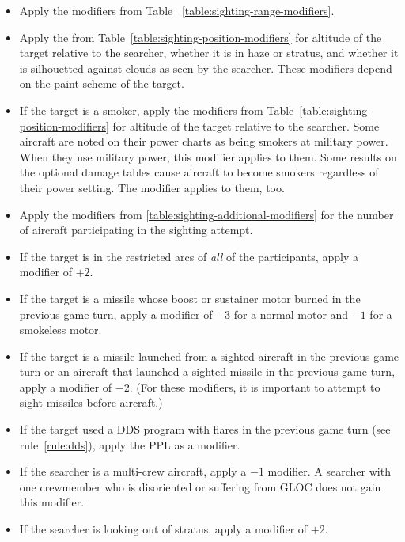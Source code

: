 {\begin{itemize}
    \item {} Apply the modifiers from Table ~\ref{table:sighting-range-modifiers}.
    \item {} Apply the from Table~\ref{table:sighting-position-modifiers} for altitude of the target relative to the searcher, whether it is in haze or stratus, and whether it is silhouetted against clouds as seen by the searcher. These modifiers depend on the paint scheme of the target.
    \item {} If the target is a smoker, apply the modifiers from Table~\ref{table:sighting-position-modifiers} for altitude of the target relative to the searcher. Some aircraft are noted on their power charts as being smokers at military power. When they use military power, this modifier applies to them. Some results on the optional damage tables cause aircraft to become smokers regardless of their power setting. The modifier applies to them, too.
    \item {} Apply the modifiers from \ref{table:sighting-additional-modifiers} for the number of aircraft participating in the sighting attempt. 
    \item {} If the target is in the restricted arcs of \emph{all} of the participants, apply a modifier of $+2$.
    \item {} If the target is a missile whose boost or sustainer motor burned in the previous game turn, apply a modifier of $-3$ for a normal motor and $-1$ for a smokeless motor.
    \item {} If the target is a missile launched from a sighted aircraft in the previous game turn or an aircraft that launched a sighted missile in the previous game turn, apply a modifier of $-2$. (For these modifiers, it is important to attempt to sight missiles before aircraft.)
    \item {} If the target used a DDS program with flares in the previous game turn (see rule~\ref{rule:dds}), apply the PPL as a modifier.
    \item {} If the searcher is a multi-crew aircraft,    
    apply a $-1$ modifier. A searcher with one crewmember who is disoriented or suffering from GLOC does not gain this modifier.
    \item {} If the searcher is looking out of stratus, apply a modifier of $+2$.

\end{itemize}}
